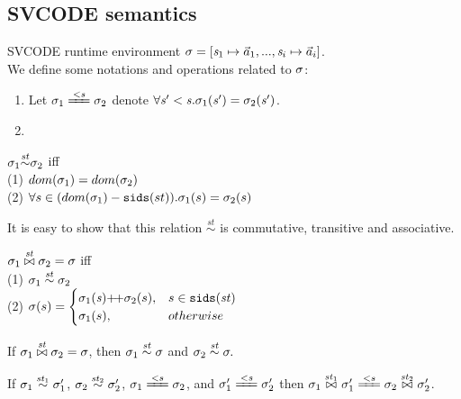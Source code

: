 \subsection{SVCODE semantics}

SVCODE runtime environment $\sgm = [\s_1 \|-> {\a_1},...,\s_i \|-> {\a_i}]$.\\
We define some notations and operations related to $\sigma$:
\begin{enumerate}[(1)]
\item Let $\sgm_1 \ConEq{\s} \sgm_2$ denote $\forall \mathit{s}' < \mathit{s}. \sigma_1(\mathit{s}') = \sigma_2(\mathit{s}')$. \\

\item {}
\PT{\Axiom{\sgm(\s) = \a}} 

\end{enumerate}

\begin{defi}
	\label{def-sgm-sim}
	
	$\sigma_1 {\stackrel{\mathit{st}}{\sim}} \sigma_2 $
	 iff \\
	(1) $dom(\sigma_1) = dom(\sigma_2)$ \\
	(2) $\forall s \in (dom(\sigma_1) - \mathtt{sids}(st)).\sigma_1(s)= \sigma_2(s)$ \\
\end{defi}

It is easy to show that this relation $\overset{st}{\sim}$ is commutative, transitive and associative.


\begin{defi}
	\label{def-sgm-join}
	$\sigma_1 \stackrel{\mathit{st}}{\bowtie} \sigma_2 = \sigma$ iff \\
	(1) $\sigma_1 \stackrel{\mathit{st}}{\sim} \sigma_2$  \\
	(2) $\sgm(s) =
		\begin{cases}
		\sgm_1(\s) {\++} \sgm_2(s), & s \in \sids{\st} \\
		\sgm_1(s),&  otherwise
		\end{cases} $
\end{defi}

\begin{lem} \label{lem-join1}
	If $\sigma_1 \stackrel{\mathit{st}}{\bowtie} \sigma_2 = \sigma$, 
	then $\sigma_1 \stackrel{\mathit{st}}{\sim} \sigma$ and $\sigma_2 \stackrel{\mathit{st}}{\sim} \sigma.$
\end{lem}

\begin{lem}\label{lem-join2}
	If $\sigma_1 \stackrel{\mathit{st}_1}{\sim} \sigma'_1$, $\sigma_2 \stackrel{\mathit{st}_2}{\sim} \sigma'_2$, $\sgm_1 \ConEq{s} \sgm_2$,
	 and $\sgm'_1 \ConEq{\s} \sgm_2'$  
	then $\sgm_1 \x{\st_1} \sgm_1' \ConEq{s} \sgm_2 \x{\st_2} \sgm'_2$. 
\end{lem}

